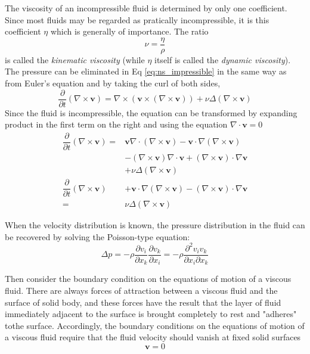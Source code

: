 \documentclass[conference]{IEEEtran}
\theoremstyle{definition}
\theoremstyle{remark}
\begin{document}
    The viscosity of an incompressible fluid is determined by only one coefficient. Since most fluids may be regarded as pratically incompressible, it is this coefficient $\eta$ which is generally of importance. The ratio
    \[
        \nu = \dfrac{\eta}{\rho}
    \]
    is called the \emph{kinematic viscosity} (while $\eta$ itself is called the \emph{dynamic viscosity}). The pressure can be eliminated in Eq \ref{eq:ns_impressible} in the same way as from Euler's equation and by taking the curl of both sides, 
    \[
        \dfrac{\partial}{\partial t} (\nabla \times \mathbf{v}) = \nabla \times (\mathbf{v} \times (\nabla \times \mathbf{v})) + \nu \Delta (\nabla \times \mathbf{v})
    \]
    Since the fluid is incompressible, the equation can be transformed by expanding product in the first term on the right and using the equation $\nabla \cdot \mathbf{v} = 0$
    \begin{align}
        \dfrac{\partial}{\partial t} (\nabla \times \mathbf{v}) =& \mathbf{v} \nabla \cdot (\nabla \times \mathbf{v}) - \mathbf{v} \cdot \nabla (\nabla \times \mathbf{v}) \nonumber \\
        &- (\nabla \times \mathbf{v}) \nabla \cdot \mathbf{v} + (\nabla \times \mathbf{v}) \cdot \nabla \mathbf{v} \nonumber \\
        &+ \nu \Delta (\nabla \times \mathbf{v}) \nonumber \\
        \dfrac{\partial}{\partial t} (\nabla \times \mathbf{v}) &+ \mathbf{v} \cdot \nabla (\nabla \times \mathbf{v}) -  (\nabla \times \mathbf{v}) \cdot \nabla \mathbf{v} \nonumber \\
        =& \nu \Delta (\nabla \times \mathbf{v})
    \end{align}

    When the velocity distribution is known, the pressure distribution in the fluid can be recovered by solving the Poisson-type equation:
    \begin{equation}
        \Delta p = -\rho \dfrac{\partial v_i}{\partial x_k} \dfrac{\partial v_k}{\partial x_i} = -\rho \dfrac{\partial^2 v_iv_k}{\partial x_i \partial x_k}
    \end{equation}

    Then consider the boundary condition on the equations of motion of a viscous fluid. There are always forces of attraction between a viscous fluid and the surface of solid body, and these forces have the result that the layer of fluid immediately adjacent to the surface is brought completely to rest and "adheres" tothe surface. Accordingly, the boundary conditions on the equations of motion of a viscous fluid require that the fluid velocity should vanish at fixed solid surfaces
    \begin{equation}
        \mathbf{v} = 0
    \end{equation}
\end{document}
